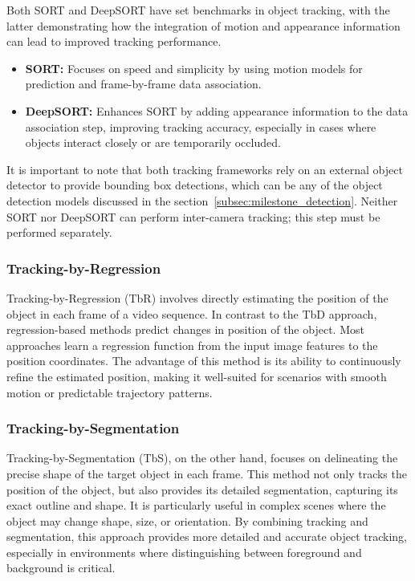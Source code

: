 Both SORT and DeepSORT have set benchmarks in object tracking, with the latter demonstrating how the integration of motion and appearance information can lead to improved tracking performance.

\begin{itemize}
    \item \textbf{SORT:} Focuses on speed and simplicity by using motion models for prediction and frame-by-frame data association.
    \item \textbf{DeepSORT:} Enhances SORT by adding appearance information to the data association step, improving tracking accuracy, especially in cases where objects interact closely or are temporarily occluded.
\end{itemize}

It is important to note that both tracking frameworks rely on an external object detector to provide bounding box detections, which can be any of the object detection models discussed in the section~\ref{subsec:milestone_detection}. Neither SORT nor DeepSORT can perform inter-camera tracking; this step must be performed separately.

\subsubsection{Tracking-by-Regression}\label{subsubsec:tracking-by-regression}
Tracking-by-Regression (TbR) involves directly estimating the position of the object in each frame of a video sequence. In contrast to the TbD approach, regression-based methods predict changes in position of the object. Most approaches learn a regression function from the input image features to the position coordinates. The advantage of this method is its ability to continuously refine the estimated position, making it well-suited for scenarios with smooth motion or predictable trajectory patterns.

\subsubsection{Tracking-by-Segmentation}\label{subsubsec:tracking-by-segmentation}
Tracking-by-Segmentation (TbS), on the other hand, focuses on delineating the precise shape of the target object in each frame. This method not only tracks the position of the object, but also provides its detailed segmentation, capturing its exact outline and shape. It is particularly useful in complex scenes where the object may change shape, size, or orientation. By combining tracking and segmentation, this approach provides more detailed and accurate object tracking, especially in environments where distinguishing between foreground and background is critical.

